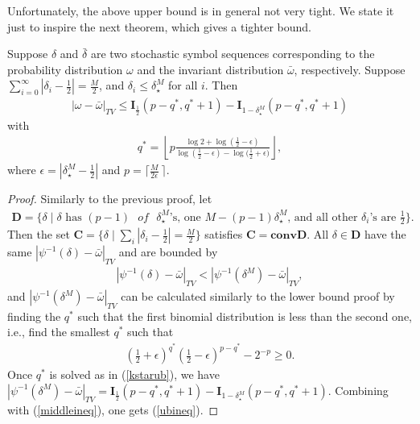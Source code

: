 Unfortunately, the above upper bound is in general not very tight. We state it just to inspire the next theorem, which gives a tighter bound.

\begin{theorem}
\label{theoremub2}
Suppose $\delta$ and $\bar{\delta}$ are two stochastic symbol sequences corresponding to the probability distribution $\omega$ and the invariant distribution $\bar{\omega}$, respectively. Suppose $\sum_{i=0}^\infty |\delta_i - \frac{1}{2}| = \frac{M}{2}$, and $\delta_i \le \delta^M_\star$ for all $i$. Then
\begin{eqnarray}
\label{ubineq}
|\omega-\bar{\omega}|_{TV} \le  \mathbf{I}_{\frac{1}{2}}(p-q^*,q^*+1) - \mathbf{I}_{1-\delta^M_\star}(p-q^*,q^*+1)
\end{eqnarray}
with
\begin{eqnarray}
\label{kstarub}
q^* =  \left\lfloor p \frac{\log{2}+\log{(\frac{1}{2}-\epsilon)} }{\log{(\frac{1}{2}-\epsilon)}-\log{(\frac{1}{2}+\epsilon})}  \right\rfloor,
\end{eqnarray}
where $\epsilon = |\delta^M_\star - \frac{1}{2}|$ and $p = \lceil \frac{M}{2\epsilon}\ \rceil$.
\end{theorem}

\begin{proof} Similarly to the previous proof, let
\begin{eqnarray}
  \mathbf{D}=\{\delta \mid \delta \text{ has } (p-1)\text{ }  of \text{ } \delta^M_\star\text{'s, one } M-(p-1) \delta^M_\star
                \text{, and all other }\delta_i\text{'s are }\frac{1}{2}   \}.
\end{eqnarray}
Then the set  $\mathbf{C} = \{\delta \mid \sum_i|\delta_i-\frac{1}{2}|  =  \frac{M}{2}\}$ satisfies $\mathbf{C} = \mathbf{conv} \mathbf{D}$. All $\delta \in \mathbf{D}$ have the same $|\psi^{-1}(\delta) - \bar{\omega}|_{TV} $ and are bounded by
\begin{eqnarray}
\label{middleineq}
 |\psi^{-1}(\delta) - \bar{\omega}|_{TV} < |\psi^{-1}(\delta^M) - \bar{\omega}|_{TV},
\end{eqnarray}
and $|\psi^{-1}(\delta^M) - \bar{\omega}|_{TV}$ can be calculated similarly to the lower bound proof by finding the $q^*$ such that the first binomial distribution is less than the second one, i.e., find the smallest $q^*$ such that
\begin{eqnarray}
\left(\frac{1}{2}+\epsilon\right)^{q^*}\left(\frac{1}{2}-\epsilon\right)^{p-q^*}-2^{-p} \ge 0.
\end{eqnarray}
Once $q^*$ is solved as in (\ref{kstarub}), we have $|\psi^{-1}(\delta^M) - \bar{\omega}|_{TV} = \mathbf{I}_{\frac{1}{2}}(p-q^*,q^*+1) - \mathbf{I}_{1-\delta^M_\star}(p-q^*,q^*+1)$. Combining with (\ref{middleineq}), one gets (\ref{ubineq}).
\end{proof}



